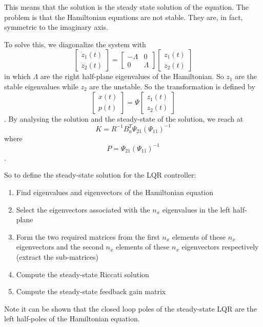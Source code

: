 This means that the solution is the steady state solution of the equation. The problem is that the Hamiltonian equations are not stable. They are, in fact, symmetric to the imaginary axis.

To solve this, we diagonalize the system with \[
    \begin{bmatrix} \dot{z}_1(t) \\ \dot{z}_2(t) \end{bmatrix} = \begin{bmatrix} -\Lambda & 0 \\ 0 & \Lambda \end{bmatrix} \begin{bmatrix} z_1(t) \\ z_2(t) \end{bmatrix} 
\] in which $\Lambda$ are the right half-plane eigenvalues of the Hamiltonian. So $z_1$ are the stable eigenvalues while $z_2$ are the unstable. So the transformation is defined by \[
\begin{bmatrix} x(t) \\ p(t) \end{bmatrix} = \Psi \begin{bmatrix} z_1(t) \\ z_2(t) \end{bmatrix} 
\]. By analysing the solution and the steady-state of the solution, we reach at \[
K = R^{-1}B_u^{T}\Psi_{21}(\Psi_{11})^{-1}
\] where \[
P = \Psi_{21}(\Psi_{11})^{-1}
\].

So to define the steady-state solution for the LQR controller:
\begin{enumerate}
    \item Find eigenvalues and eigenvectors of the Hamiltonian equation
    \item Select the eigenvectors associated with the $n_x$ eigenvalues in the left half-plane
    \item Form the two required matrices from the first $n_x$ elements of these $n_x$ eigenvectors and the second $n_x$ elements of these $n_x$ eigenvectors respectively (extract the sub-matrices)
    \item Compute the steady-state Riccati solution
    \item Compute the steady-state feedback gain matrix
\end{enumerate}

Note it can be shown that the closed loop poles of the steady-state LQR are the left half-poles of the Hamiltonian equation.
